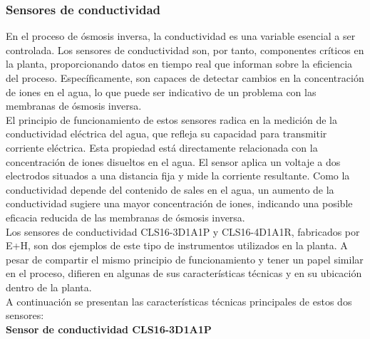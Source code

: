 \subsubsection{Sensores de conductividad}

En el proceso de ósmosis inversa, la conductividad es una variable esencial a ser controlada. Los sensores de conductividad son, por tanto, componentes críticos en la planta, proporcionando datos en tiempo real que informan sobre la eficiencia del proceso. Específicamente, son capaces de detectar cambios en la concentración de iones en el agua, lo que puede ser indicativo de un problema con las membranas de ósmosis inversa.\\

El principio de funcionamiento de estos sensores radica en la medición de la conductividad eléctrica del agua, que refleja su capacidad para transmitir corriente eléctrica. Esta propiedad está directamente relacionada con la concentración de iones disueltos en el agua. El sensor aplica un voltaje a dos electrodos situados a una distancia fija y mide la corriente resultante. Como la conductividad depende del contenido de sales en el agua, un aumento de la conductividad sugiere una mayor concentración de iones, indicando una posible eficacia reducida de las membranas de ósmosis inversa.\\

Los sensores de conductividad CLS16-3D1A1P y CLS16-4D1A1R, fabricados por E+H, son dos ejemplos de este tipo de instrumentos utilizados en la planta. A pesar de compartir el mismo principio de funcionamiento y tener un papel similar en el proceso, difieren en algunas de sus características técnicas y en su ubicación dentro de la planta.\\

A continuación se presentan las características técnicas principales de estos dos sensores:\\


\textbf{Sensor de conductividad CLS16-3D1A1P}


